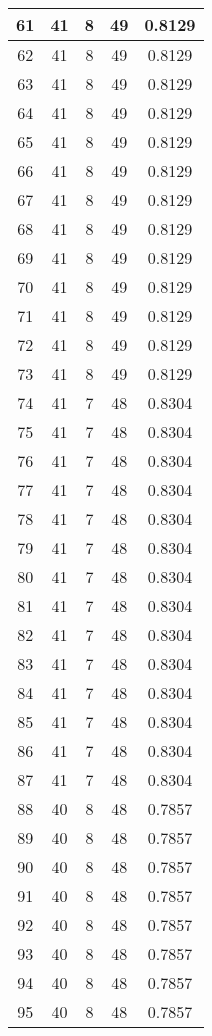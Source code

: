 \documentclass[letterpaper, 12pt]{article}
\begin{document}
\begin{longtable}{|c|c|c|c|c|}
61 & 41 & 8 & 49 & 0.8129 \\
\hline
62 & 41 & 8 & 49 & 0.8129 \\
\hline
63 & 41 & 8 & 49 & 0.8129 \\
\hline
64 & 41 & 8 & 49 & 0.8129 \\
\hline
65 & 41 & 8 & 49 & 0.8129 \\
\hline
66 & 41 & 8 & 49 & 0.8129 \\
\hline
67 & 41 & 8 & 49 & 0.8129 \\
\hline
68 & 41 & 8 & 49 & 0.8129 \\
\hline
69 & 41 & 8 & 49 & 0.8129 \\
\hline
70 & 41 & 8 & 49 & 0.8129 \\
\hline
71 & 41 & 8 & 49 & 0.8129 \\
\hline
72 & 41 & 8 & 49 & 0.8129 \\
\hline
73 & 41 & 8 & 49 & 0.8129 \\
\hline
74 & 41 & 7 & 48 & 0.8304 \\
\hline
75 & 41 & 7 & 48 & 0.8304 \\
\hline
76 & 41 & 7 & 48 & 0.8304 \\
\hline
77 & 41 & 7 & 48 & 0.8304 \\
\hline
78 & 41 & 7 & 48 & 0.8304 \\
\hline
79 & 41 & 7 & 48 & 0.8304 \\
\hline
80 & 41 & 7 & 48 & 0.8304 \\
\hline
81 & 41 & 7 & 48 & 0.8304 \\
\hline
82 & 41 & 7 & 48 & 0.8304 \\
\hline
83 & 41 & 7 & 48 & 0.8304 \\
\hline
84 & 41 & 7 & 48 & 0.8304 \\
\hline
85 & 41 & 7 & 48 & 0.8304 \\
\hline
86 & 41 & 7 & 48 & 0.8304 \\
\hline
87 & 41 & 7 & 48 & 0.8304 \\
\hline
88 & 40 & 8 & 48 & 0.7857 \\
\hline
89 & 40 & 8 & 48 & 0.7857 \\
\hline
90 & 40 & 8 & 48 & 0.7857 \\
\hline
91 & 40 & 8 & 48 & 0.7857 \\
\hline
92 & 40 & 8 & 48 & 0.7857 \\
\hline
93 & 40 & 8 & 48 & 0.7857 \\
\hline
94 & 40 & 8 & 48 & 0.7857 \\
\hline
95 & 40 & 8 & 48 & 0.7857 \\

\end{longtable}
\end{document}
